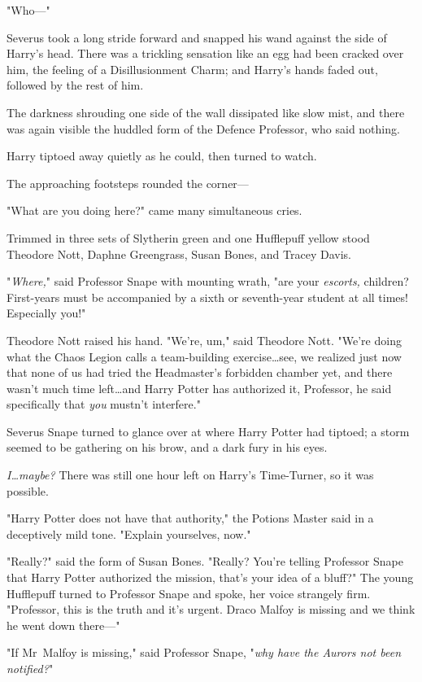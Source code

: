 "Who—"

Severus took a long stride forward and snapped his wand against the side of
Harry's head. There was a trickling sensation like an egg had been cracked over
him, the feeling of a Disillusionment Charm; and Harry's hands faded out,
followed by the rest of him.

The darkness shrouding one side of the wall dissipated like slow mist, and
there was again visible the huddled form of the Defence Professor, who said
nothing.

Harry tiptoed away quietly as he could, then turned to watch.

The approaching footsteps rounded the corner—

"What are you doing here?" came many simultaneous cries.

Trimmed in three sets of Slytherin green and one Hufflepuff yellow stood
Theodore Nott, Daphne Greengrass, Susan Bones, and Tracey Davis.

"\emph{Where,}" said Professor Snape with mounting wrath, "are your
\emph{escorts,} children? First-years must be accompanied by a sixth or
seventh-year student at all times! Especially you!"

Theodore Nott raised his hand. "We're, um," said Theodore Nott. "We're doing
what the Chaos Legion calls a team-building exercise…see, we realized
just now that none of us had tried the Headmaster's forbidden chamber yet, and
there wasn't much time left…and Harry Potter has authorized it,
Professor, he said specifically that \emph{you} mustn't interfere."

Severus Snape turned to glance over at where Harry Potter had tiptoed; a storm
seemed to be gathering on his brow, and a dark fury in his eyes.

\emph{I…maybe?} There was still one hour left on Harry's Time-Turner,
so it was possible.

"Harry Potter does not have that authority," the Potions Master said in a
deceptively mild tone. "Explain yourselves, now."

"Really?" said the form of Susan Bones. "Really? You're telling Professor Snape
that Harry Potter authorized the mission, that's your idea of a bluff?" The
young Hufflepuff turned to Professor Snape and spoke, her voice strangely firm.
"Professor, this is the truth and it's urgent. Draco Malfoy is missing and we
think he went down there—"

"If Mr~Malfoy is missing," said Professor Snape, "\emph{why have the Aurors
not been notified?}"

